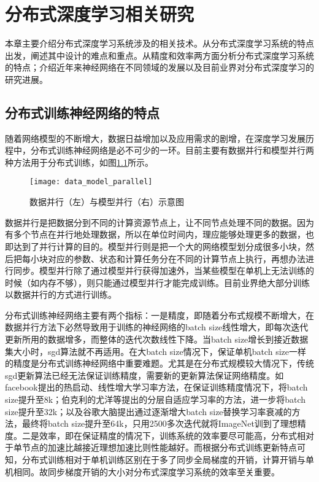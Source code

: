 \chapter{分布式深度学习相关研究}
本章主要介绍分布式深度学习系统涉及的相关技术。从分布式深度学习系统的特点出发，阐述其中设计的难点和重点。从精度和效率两方面分析分布式深度学习系统的特点；介绍近年来神经网络在不同领域的发展以及目前业界对分布式深度学习的研究进展。
\section{分布式训练神经网络的特点}
随着网络模型的不断增大，数据日益增加以及应用需求的剧增，在深度学习发展历程中，分布式训练神经网络是必不可少的一环。目前主要有数据并行和模型并行两种方法用于分布式训练，如图\ref{fig:data_model_parallel}所示。

\begin{figure}[htp]
\centering
\texttt{[image: data\_model\_parallel]}
\caption{数据并行（左）与模型并行（右）示意图}
\label{fig:data_model_parallel}
\end{figure}
数据并行是把数据分到不同的计算资源节点上，让不同节点处理不同的数据。因为有多个节点在并行地处理数据，所以在单位时间内，理应能够处理更多的数据，也即达到了并行计算的目的。模型并行则是把一个大的网络模型划分成很多小块，然后把每小块对应的参数、状态和计算任务分在不同的计算节点上执行，再想办法进行同步。模型并行除了通过模型并行获得加速外，当某些模型在单机上无法训练的时候（如内存不够），则只能通过模型并行才能完成训练。目前业界绝大部分训练以数据并行的方式进行训练。

分布式训练神经网络主要有两个指标：一是精度，即随着分布式规模不断增大，在数据并行方法下必然导致用于训练的神经网络的batch size线性增大，即每次迭代更新所用的数据增多，而整体的迭代次数线性下降。当batch size增长到接近数据集大小时，sgd算法就不再适用。在大batch size情况下，保证单机batch size一样的精度是分布式训练神经网络中重要难题。尤其是在分布式规模较大情况下，传统sgd更新算法已经无法保证训练精度，需要新的更新算法保证网络精度。如facebook提出的热启动、线性增大学习率方法，在保证训练精度情况下，将batch size提升至8k；伯克利的尤洋等提出的分层自适应学习率的方法，进一步将batch size提升至32k；以及谷歌大脑提出通过逐渐增大batch size替换学习率衰减的方法，最终将batch size提升至64k，只用2500多次迭代就将ImageNet训到了理想精度。二是效率，即在保证精度的情况下，训练系统的效率要尽可能高，分布式相对于单节点的加速比越接近理想加速比则性能越好。而根据分布式训练更新特点可知，分布式训练相对于单机训练区别在于多了同步全局梯度的开销，计算开销与单机相同。故同步梯度开销的大小对分布式深度学习系统的效率至关重要。

